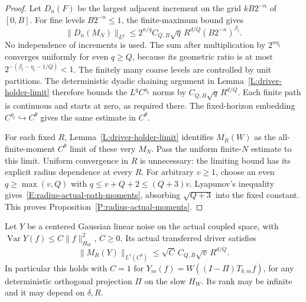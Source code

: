 \begin{proof}
  Let $D_n(F)$ be the largest adjacent increment on the grid
  $kB2^{-n}$ of $[0,B]$.
  For fine levels $B2^{-n}\le1$, the finite-maximum bound gives
  \[
    \|D_n(M_N)\|_{L^q}
    \le2^{n/q}C_{Q,B}\sqrt q\,R^{d/Q}(B2^{-n})^{\beta_t}.
  \]
  No independence of increments is used. The sum after multiplication
  by $2^{n\eta_t}$ converges uniformly for even $q\ge Q$, because
  its geometric ratio is at most
  $2^{-(\beta_t-\eta_t-1/Q)}<1$.
  The finitely many coarse levels are controlled by unit partitions.
  The deterministic dyadic chaining argument in
  Lemma~\ref{L:driver-holder-limit} therefore bounds the
  $L^qC^{\eta_t}$ norms by $C_{Q,B}\sqrt q\,R^{d/Q}$.
  Each finite path is continuous and starts at zero, as required there.
  The fixed-horizon embedding $C^{\eta_t}\hookrightarrow C^\theta$
  gives the same estimate in $C^\theta$.

  For each fixed $R$, Lemma~\ref{L:driver-holder-limit} identifies
  $M_R(W)$ as the all-finite-moment $C^\theta$ limit of these
  very $M_N$. Pass the uniform finite-$N$ estimate to this limit.
  Uniform convergence in $R$ is unnecessary: the limiting bound has
  its explicit radius dependence at every $R$.
  For arbitrary $v\ge1$, choose an even $q\ge\max(v,Q)$ with
  $q\le v+Q+2\le(Q+3)v$.
  Lyapunov's inequality gives~\eqref{E:radius-actual-path-moments},
  absorbing $\sqrt{Q+3}$ into the fixed constant.
  This proves Proposition~\ref{P:radius-actual-moments}.
\end{proof}

\begin{corollary}
  \label{C:radius-covariance-residuals}
  Let $Y$ be a centered Gaussian linear noise on the actual coupled
  space, with $\operatorname{Var}Y(f)\le C\|f\|_{H_W}^2$, $C\ge0$.
  Its actual transferred driver satisfies
  \[
    \|M_R(Y)\|_{L^v(C^\theta)}
    \le\sqrt C\,C_{Q,B}\sqrt v\,R^{d/Q}.
  \]
  In particular this holds with $C=1$ for
  $Y_m(f)=W((I-\Pi)T_{\delta,m}f)$, for any deterministic
  orthogonal projection $\Pi$ on the slow $H_W$.
  Its rank may be infinite and it may depend on $\delta,R$.
\end{corollary}

